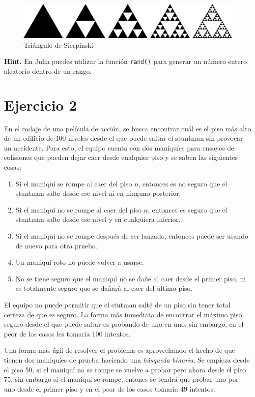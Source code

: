 \documentclass[a4paper]{article}
\begin{document}
\begin{figure}[h!]
    \centering
    \includegraphics[width=.8\linewidth]{img/sierp.png}
    \caption{Triángulo de Sierpinski}
    \label{fig:sierp_0}
\end{figure}

\textbf{Hint.} En Julia puedes utilizar la función \texttt{rand()} para generar un número entero aleatorio dentro de un rango.


\section*{Ejercicio 2} \label{Sec: Ejercicio 2}

En el rodaje de una película de acción, se busca encontrar cuál es el piso más alto de un edificio de 100 niveles desde el que puede saltar el stuntman sin provocar un accidente. Para esto, el equipo cuenta con dos maniquíes para ensayos de colisiones que pueden dejar caer desde cualquier piso y se saben las siguientes cosas:

\begin{enumerate}
    \item Si el maniquí se rompe al caer del piso $n$, entonces es no seguro que el stuntman salte desde ese nivel ni en ninguno posterior.
    \item Si el maniquí no se rompe al caer del piso $n$, entonces es seguro que el stuntman salte desde ese nivel y en cualquiera inferior.
    \item Si el maniquí no se rompe después de ser lanzado, entonces puede ser usando de nuevo para otra prueba.
    \item Un maniquí roto no puede volver a usarse.
    \item No se tiene seguro que el maniquí no se dañe al caer desde el primer piso, ni es totalmente seguro que se dañará al caer del último piso.
\end{enumerate}

El equipo no puede permitir que el stutman salté de un piso sin tener total certeza de que es seguro. La forma más inmediata de encontrar el máximo piso seguro desde el que puede saltar es probando de uno en uno, sin embargo, en el peor de los casos les tomaría 100 intentos.

Una forma más ágil de resolver el problema es aprovechando el hecho de que tienen dos maniquíes de prueba haciendo una \textit{búsqueda binaria}. Se empieza desde el piso 50, si el maniquí no se rompe se vuelve a probar pero ahora desde el piso 75, sin embargo si el maniquí se rompe, entones se tendrá que probar uno por uno desde el primer piso y en el peor de los casos tomaría 49 intentos.
\end{document}
